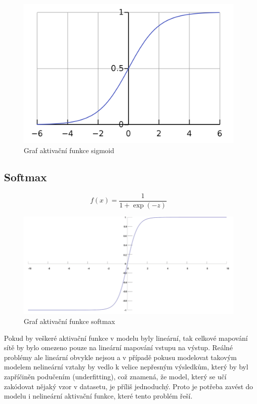 
\begin{figure}[H]
    \centering
    \includegraphics[scale=0.18]{obrazky-figures/sigmoid.png}
    \caption{\label{fig:sigmoid}Graf aktivační funkce sigmoid}
\end{figure}

\subsection*{Softmax}
\begin{equation}
  f(x) = \frac{1}{1+\exp(-z)}
\end{equation}


\begin{figure}[H]
    \centering
    \includegraphics[scale=0.35]{obrazky-figures/softmax.png}
    \caption{\label{fig:softmax}Graf aktivační funkce softmax}
\end{figure}

Pokud by veškeré aktivační funkce v modelu byly lineární, tak celkové mapování sítě by bylo omezeno pouze na lineární mapování vstupu na výstup. Reálné problémy ale lineární obvykle nejsou a v případě pokusu modelovat takovým modelem nelineární vztahy by vedlo k velice nepřesným výsledkům, který by byl zapříčiněn podučením (underfitting), což znamená, že model, který se učí zakódovat nějaký vzor v datasetu, je příliš jednoduchý. Proto je potřeba zavést do modelu i nelineární aktivační funkce, které tento problém řeší\cite[p.~77--78]{mitdeeplearning_small}.

